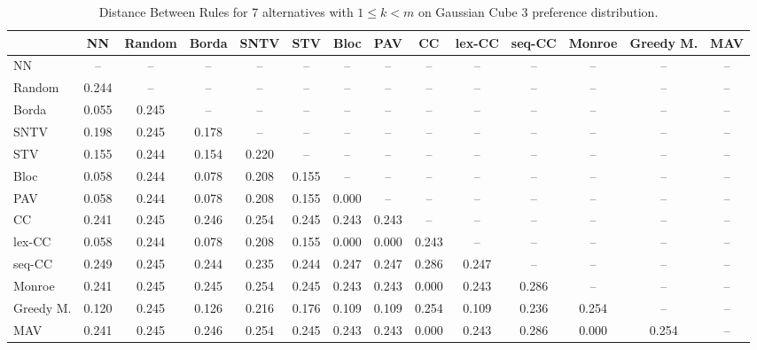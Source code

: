 
\begin{table*}
\centering
\begin{tabular}{lccccccccccccc}
\toprule
 & NN & Random & Borda & SNTV & STV & Bloc & PAV & CC & lex-CC & seq-CC & Monroe & Greedy M. & MAV \\
\midrule
NN & -- & -- & -- & -- & -- & -- & -- & -- & -- & -- & -- & -- & -- \\
Random & 0.244 & -- & -- & -- & -- & -- & -- & -- & -- & -- & -- & -- & -- \\
Borda & 0.055 & 0.245 & -- & -- & -- & -- & -- & -- & -- & -- & -- & -- & -- \\
SNTV & 0.198 & 0.245 & 0.178 & -- & -- & -- & -- & -- & -- & -- & -- & -- & -- \\
STV & 0.155 & 0.244 & 0.154 & 0.220 & -- & -- & -- & -- & -- & -- & -- & -- & -- \\
Bloc & 0.058 & 0.244 & 0.078 & 0.208 & 0.155 & -- & -- & -- & -- & -- & -- & -- & -- \\
PAV & 0.058 & 0.244 & 0.078 & 0.208 & 0.155 & 0.000 & -- & -- & -- & -- & -- & -- & -- \\
CC & 0.241 & 0.245 & 0.246 & 0.254 & 0.245 & 0.243 & 0.243 & -- & -- & -- & -- & -- & -- \\
lex-CC & 0.058 & 0.244 & 0.078 & 0.208 & 0.155 & 0.000 & 0.000 & 0.243 & -- & -- & -- & -- & -- \\
seq-CC & 0.249 & 0.245 & 0.244 & 0.235 & 0.244 & 0.247 & 0.247 & 0.286 & 0.247 & -- & -- & -- & -- \\
Monroe & 0.241 & 0.245 & 0.245 & 0.254 & 0.245 & 0.243 & 0.243 & 0.000 & 0.243 & 0.286 & -- & -- & -- \\
Greedy M. & 0.120 & 0.245 & 0.126 & 0.216 & 0.176 & 0.109 & 0.109 & 0.254 & 0.109 & 0.236 & 0.254 & -- & -- \\
MAV & 0.241 & 0.245 & 0.246 & 0.254 & 0.245 & 0.243 & 0.243 & 0.000 & 0.243 & 0.286 & 0.000 & 0.254 & -- \\
\bottomrule
\end{tabular}

\caption{Distance Between Rules for 7 alternatives with $1 \leq k < m$ on Gaussian Cube 3 preference distribution.}
\end{table*}
